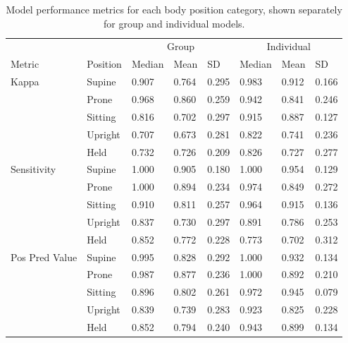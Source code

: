\documentclass[
  man]{apa6}
\begin{document}
\begin{table}[tbp]

\begin{center}
\begin{threeparttable}

\caption{\label{tab:metrics-by-class}Model performance metrics for each body position category, shown separately for group and individual models.}

\begin{tabular}{llllllll}
\toprule
 &  & \multicolumn{3}{c}{Group} & \multicolumn{3}{c}{Individual} \\
\cmidrule(r){3-5} \cmidrule(r){6-8}
Metric & Position & Median & Mean & SD & Median & Mean & SD\\
\midrule
Kappa & Supine & 0.907 & 0.764 & 0.295 & 0.983 & 0.912 & 0.166\\
 & Prone & 0.968 & 0.860 & 0.259 & 0.942 & 0.841 & 0.246\\
 & Sitting & 0.816 & 0.702 & 0.297 & 0.915 & 0.887 & 0.127\\
 & Upright & 0.707 & 0.673 & 0.281 & 0.822 & 0.741 & 0.236\\
 & Held & 0.732 & 0.726 & 0.209 & 0.826 & 0.727 & 0.277\\ \midrule
Sensitivity & Supine & 1.000 & 0.905 & 0.180 & 1.000 & 0.954 & 0.129\\
 & Prone & 1.000 & 0.894 & 0.234 & 0.974 & 0.849 & 0.272\\
 & Sitting & 0.910 & 0.811 & 0.257 & 0.964 & 0.915 & 0.136\\
 & Upright & 0.837 & 0.730 & 0.297 & 0.891 & 0.786 & 0.253\\
 & Held & 0.852 & 0.772 & 0.228 & 0.773 & 0.702 & 0.312\\ \midrule
Pos Pred Value & Supine & 0.995 & 0.828 & 0.292 & 1.000 & 0.932 & 0.134\\
 & Prone & 0.987 & 0.877 & 0.236 & 1.000 & 0.892 & 0.210\\
 & Sitting & 0.896 & 0.802 & 0.261 & 0.972 & 0.945 & 0.079\\
 & Upright & 0.839 & 0.739 & 0.283 & 0.923 & 0.825 & 0.228\\
 & Held & 0.852 & 0.794 & 0.240 & 0.943 & 0.899 & 0.134\\
\bottomrule
\end{tabular}

\end{threeparttable}
\end{center}

\end{table}
\end{document}

